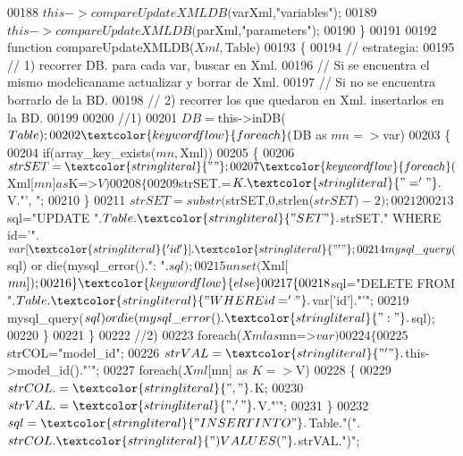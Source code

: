 \begin{DoxyCode}
00188     $this->compareUpdateXMLDB($varXml,\textcolor{stringliteral}{"variables"});
00189     $this->compareUpdateXMLDB($parXml,\textcolor{stringliteral}{"parameters"});
00190   \}
00191   
00192   \textcolor{keyword}{function} compareUpdateXMLDB($Xml,$Table)
00193   \{    
00194     \textcolor{comment}{// estrategia: }
00195     \textcolor{comment}{// 1) recorrer DB. para cada var, buscar en Xml.}
00196     \textcolor{comment}{//                      Si se encuentra el mismo modelicaname actualizar y
       borrar de Xml. }
00197     \textcolor{comment}{//                      Si no se encuentra borrarlo de la BD.     }
00198     \textcolor{comment}{// 2) recorrer los que quedaron en Xml. insertarlos en la BD.}
00199     
00200     \textcolor{comment}{//1)}
00201     $DB =$this->inDB($Table);
00202     \textcolor{keywordflow}{foreach}($DB as $mn=>$var)
00203     \{
00204       \textcolor{keywordflow}{if}(array\_key\_exists($mn,$Xml))
00205       \{
00206         $strSET=\textcolor{stringliteral}{""};
00207         \textcolor{keywordflow}{foreach}($Xml[$mn] as $K=>$V)
00208         \{
00209           $strSET.=$K.\textcolor{stringliteral}{"='"}.$V.\textcolor{stringliteral}{"', "};
00210         \}
00211         $strSET=substr($strSET,0,strlen($strSET)-2);
00212         
00213         $sql=\textcolor{stringliteral}{"UPDATE "}.$Table.\textcolor{stringliteral}{" SET "}.$strSET.\textcolor{stringliteral}{" WHERE id='"}.$var[\textcolor{stringliteral}{'id'}].\textcolor{stringliteral}{"'"};
00214         mysql\_query($sql) or die(mysql\_error().\textcolor{stringliteral}{": "}.$sql);
00215         unset($Xml[$mn]);
00216       \}\textcolor{keywordflow}{else}
00217       \{
00218         $sql=\textcolor{stringliteral}{"DELETE FROM "}.$Table.\textcolor{stringliteral}{" WHERE id='"}.$var[\textcolor{stringliteral}{'id'}].\textcolor{stringliteral}{"'"};
00219         mysql\_query($sql) or die(mysql\_error().\textcolor{stringliteral}{": "}.$sql);
00220       \}
00221     \}
00222     \textcolor{comment}{//2)}
00223     \textcolor{keywordflow}{foreach}($Xml as $mn=>$var)
00224     \{
00225       $strCOL=\textcolor{stringliteral}{"model\_id"};
00226       $strVAL=\textcolor{stringliteral}{"'"}.$this->model\_id().\textcolor{stringliteral}{"'"};
00227       \textcolor{keywordflow}{foreach}($Xml[$mn] as $K=>$V)
00228       \{
00229         $strCOL.=\textcolor{stringliteral}{", "}.$K;
00230         $strVAL.=\textcolor{stringliteral}{", '"}.$V.\textcolor{stringliteral}{"'"};
00231       \}
00232       $sql=\textcolor{stringliteral}{"INSERT INTO "}.$Table.\textcolor{stringliteral}{"("}.$strCOL.\textcolor{stringliteral}{") VALUES("}.$strVAL.\textcolor{stringliteral}{")"};

\end{DoxyCode}

